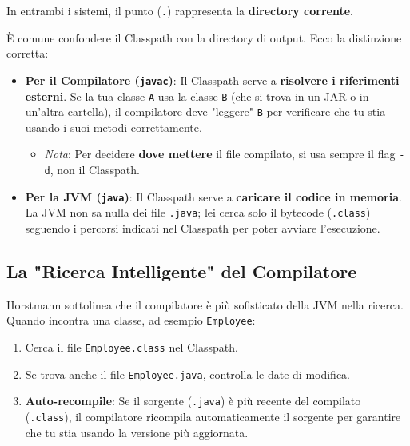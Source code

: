 \begin{observation}
    In entrambi i sistemi, il punto (\texttt{.}) rappresenta la \textbf{directory corrente}.
\end{observation}

È comune confondere il Classpath con la directory di output. Ecco la distinzione corretta:

\begin{itemize}
    \item \textbf{Per il Compilatore (\texttt{javac})}: Il Classpath serve a \textbf{risolvere i riferimenti esterni}. Se la tua classe \texttt{A} usa la classe \texttt{B} (che si trova in un JAR o in un'altra cartella), il compilatore deve "leggere" \texttt{B} per verificare che tu stia usando i suoi metodi correttamente.
    \begin{itemize}
        \item \textit{Nota}: Per decidere \textbf{dove mettere} il file compilato, si usa sempre il flag \texttt{-d}, non il Classpath.
    \end{itemize}

    \item \textbf{Per la JVM (\texttt{java})}: Il Classpath serve a \textbf{caricare il codice in memoria}. La JVM non sa nulla dei file \texttt{.java}; lei cerca solo il bytecode (\texttt{.class}) seguendo i percorsi indicati nel Classpath per poter avviare l'esecuzione.
\end{itemize}

\subsection{La "Ricerca Intelligente" del Compilatore}
Horstmann sottolinea che il compilatore è più sofisticato della JVM nella ricerca. Quando incontra una classe, ad esempio \texttt{Employee}:
\begin{enumerate}
    \item Cerca il file \texttt{Employee.class} nel Classpath.
    \item Se trova anche il file \texttt{Employee.java}, controlla le date di modifica.
    \item \textbf{Auto-recompile}: Se il sorgente (\texttt{.java}) è più recente del compilato (\texttt{.class}), il compilatore ricompila automaticamente il sorgente per garantire che tu stia usando la versione più aggiornata.
\end{enumerate}

